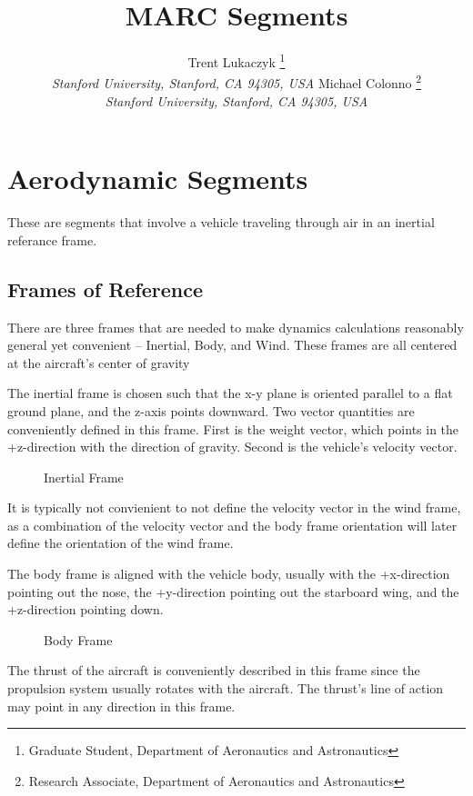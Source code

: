 \documentclass{article}
\title{MARC Segments}
\author{
  Trent Lukaczyk%
        \thanks{Graduate Student, Department of Aeronautics and Astronautics} \\
  {\normalsize\itshape Stanford University, Stanford, CA 94305, USA}
  Michael Colonno%
        \thanks{Research Associate, Department of Aeronautics and Astronautics} \\
  {\normalsize\itshape Stanford University, Stanford, CA 94305, USA}
}
\begin{document}
\maketitle

\clearpage

\section{Aerodynamic Segments}

These are segments that involve a vehicle traveling through air in an inertial referance frame.  


\subsection{Frames of Reference}

There are three frames that are needed to make dynamics calculations reasonably general yet convenient -- Inertial, Body, and Wind.  These frames are all centered at the aircraft's center of gravity

The inertial frame is chosen such that the x-y plane is oriented parallel to a flat ground plane, and the z-axis points downward.  Two vector quantities are conveniently defined in this frame.  First is the weight vector, which points in the +z-direction with the direction of gravity.  Second is the vehicle's velocity vector.  

\begin{figure}[htb] 
    \centering
    \def\svgwidth{150pt}
    
    \caption{Inertial Frame}
\end{figure} 

It is typically not convienient to not define the velocity vector in the wind frame, as a combination of the velocity vector and the body frame orientation will later define the orientation of the wind frame.

The body frame is aligned with the vehicle body, usually with the +x-direction pointing out the nose, the +y-direction pointing out the starboard wing, and the +z-direction pointing down.  

\begin{figure}[htb] 
    \centering
    \def\svgwidth{150pt}
    
    \caption{Body Frame}
\end{figure} 

The thrust of the aircraft is conveniently described in this frame since the propulsion system usually rotates with the aircraft.  The thrust's line of action may point in any direction in this frame.
\end{document}
